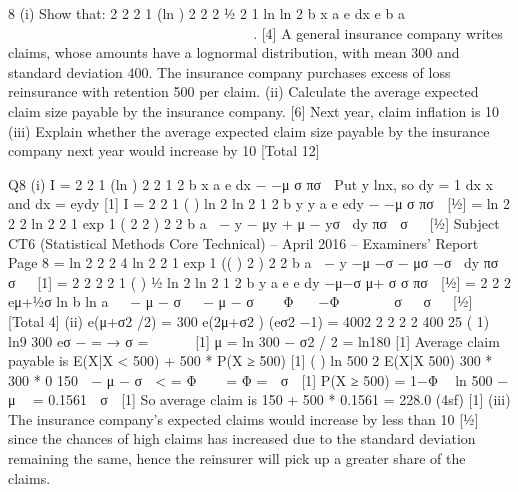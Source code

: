 \documentclass[a4paper,12pt]{article}
\begin{document}
 

8 (i) Show that:
  2
2 2
1 (ln ) 2 2
2 ½
2
1 ln ln
2
b x
a
e dx e b a
 
  
           
                
 . [4]
A general insurance company writes claims, whose amounts have a lognormal
distribution, with mean 300 and standard deviation 400. The insurance company
purchases excess of loss reinsurance with retention 500 per claim.
(ii) Calculate the average expected claim size payable by the insurance
company. [6]
Next year, claim inflation is 10%
(iii) Explain whether the average expected claim size payable by the insurance
company next year would increase by 10%
[Total 12]

Q8 (i) I =
  2
2
1 (ln )
2
2
1
2
b x
a
e dx
− −μ
σ
πσ

Put y lnx, so dy = 1 dx
x
and dx = eydy [1]
I =
  2
2
1 ( ) ln 2
ln 2
1
2
b y y
a
e edy
− −μ
σ
πσ
 [½]
=
  ln 2 2 2
ln 2 2
1 exp 1 ( 2 2 )
2 2
b
a
− y − μy + μ − yσ dy
πσ  σ 
 [½]
Subject CT6 (Statistical Methods Core Technical) – April 2016 – Examiners’ Report
Page 8
=
  ln 2 2 2 4
ln 2 2
1 exp 1 (( ) 2 )
2 2
b
a
− y −μ −σ − μσ −σ dy
πσ  σ 
 [1]
=
  2 2
2 2
1 ( ) ½ ln 2
ln 2
1
2
b y
a
e e dy
−μ−σ
μ+ σ σ
πσ  [½]
= 2 2 2
eμ+½σ ln b ln a   − μ − σ   − μ − σ   Φ  −Φ     σ   σ  
[½]
[Total 4]
(ii)
e(μ+σ2 /2) = 300
e(2μ+σ2 ) (eσ2 −1) = 4002
2 2
2
2
400 25 ( 1) ln9 300
eσ − = → σ =  
 
[1]
μ = ln 300 − σ2 / 2 = ln180 [1]
Average claim payable is
E(X|X < 500) + 500 * P(X ≥ 500) [1]
( )
ln 500 2 E(X|X 500) 300 * 300 * 0 150
 − μ − σ  < = Φ   = Φ =  σ 
[1]
P(X ≥ 500) = 1−Φ  ln 500 − μ  = 0.1561  σ 
[1]
So average claim is 150 + 500 * 0.1561 = 228.0 (4sf) [1]
(iii) The insurance company’s expected claims would increase by less than 10%
[½]
since the chances of high claims has increased due to the standard deviation remaining the same, hence the reinsurer will pick up a greater share of the claims.%


\end{document}
